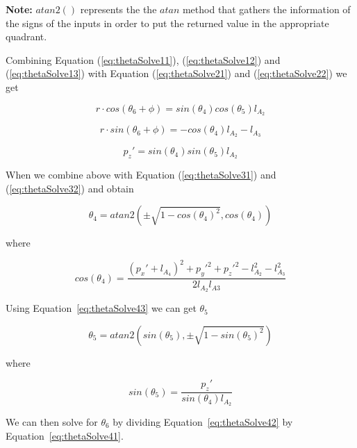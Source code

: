 \textbf{Note:} $atan2()$ represents the the $atan$ method that gathers the information of the signs of the inputs in order to put the returned value in the appropriate quadrant.

Combining Equation (\ref{eq:thetaSolve11}), (\ref{eq:thetaSolve12}) and (\ref{eq:thetaSolve13}) with Equation (\ref{eq:thetaSolve21}) and (\ref{eq:thetaSolve22}) we get

\begin{equation}\label{eq:thetaSolve41}
r \cdot cos(\theta_6+\phi) = sin(\theta_4)cos(\theta_5)l_{A_2}
\end{equation}

\begin{equation}\label{eq:thetaSolve42}
r \cdot sin(\theta_6+\phi) = -cos(\theta_4)l_{A_2}-l_{A_3}
\end{equation}

\begin{equation}\label{eq:thetaSolve43}
p_z' = sin(\theta_4)sin(\theta_5)l_{A_2}
\end{equation}


When we combine above with Equation (\ref{eq:thetaSolve31}) and (\ref{eq:thetaSolve32}) and obtain 


\begin{equation}
\theta_4 = atan2\left( \pm \sqrt{1-cos(\theta_4)^2} , cos(\theta_4)  \right)
\end{equation}

where

\begin{equation}
cos(\theta_4) = \frac{(p_x'+l_{A_4})^2  +  p_y'^2  +  p_z'^2  -  l_{A_2}^2  -  l_{A_3}^2}
                     {2l_{A_2}l_{A3}}
\end{equation}

Using Equation~\ref{eq:thetaSolve43} we can get $\theta_5$

\begin{equation}
\theta_5 = atan2(sin(\theta_5), \pm\sqrt{1-sin(\theta_5)^2})
\end{equation}

where

\begin{equation}
sin(\theta_5) = \frac{p_z'}
                     {sin(\theta_4)l_{A_2}}
\end{equation}


We can then solve for $\theta_6$ by dividing Equation~\ref{eq:thetaSolve42} by Equation~\ref{eq:thetaSolve41}.



